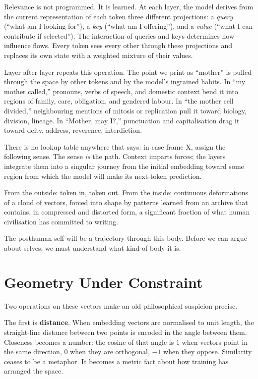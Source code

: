 \documentclass[12pt,a4paper]{article}
\begin{document}
Relevance is not programmed. It is learned. At each layer, the model derives from the current representation of each token three different projections: a \emph{query} (``what am I looking for''), a \emph{key} (``what am I offering''), and a \emph{value} (``what I can contribute if selected''). The interaction of queries and keys determines how influence flows. Every token sees every other through these projections and replaces its own state with a weighted mixture of their values.

Layer after layer repeats this operation. The point we print as ``mother'' is pulled through the space by other tokens and by the model's ingrained habits. In ``my mother called,'' pronouns, verbs of speech, and domestic context bend it into regions of family, care, obligation, and gendered labour. In ``the mother cell divided,'' neighbouring mentions of mitosis or replication pull it toward biology, division, lineage. In ``Mother, may I?,'' punctuation and capitalisation drag it toward deity, address, reverence, interdiction.

There is no lookup table anywhere that says: in case frame X, assign the following sense. The sense \emph{is} the path. Context imparts forces; the layers integrate them into a singular journey from the initial embedding toward some region from which the model will make its next-token prediction.

From the outside: token in, token out. From the inside: continuous deformations of a cloud of vectors, forced into shape by patterns learned from an archive that contains, in compressed and distorted form, a significant fraction of what human civilisation has committed to writing.

The posthuman self will be a trajectory through this body. Before we can argue about selves, we must understand what kind of body it is.

\section{Geometry Under Constraint}

Two operations on these vectors make an old philosophical suspicion precise.

The first is \textbf{distance}. When embedding vectors are normalised to unit length, the straight-line distance between two points is encoded in the angle between them. Closeness becomes a number: the cosine of that angle is $1$ when vectors point in the same direction, $0$ when they are orthogonal, $-1$ when they oppose. Similarity ceases to be a metaphor. It becomes a metric fact about how training has arranged the space.
\end{document}
